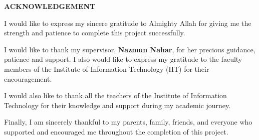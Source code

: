 
\begin{center}
	{\Large\bfseries ACKNOWLEDGEMENT}
\end{center}

I would like to express my sincere gratitude to Almighty Allah for giving me the strength and patience to complete this project successfully.

I would like to thank my supervisor, \textbf{Nazmun Nahar}, for her precious guidance, patience and support. I also would like to express my gratitude to the faculty members of the Institute of Information Technology (IIT) for their encouragement.

I would also like to thank all the teachers of the Institute of Information Technology for their knowledge and support during my academic journey.

Finally, I am sincerely thankful to my parents, family, friends, and everyone who supported and encouraged me throughout the completion of this project.


\clearpage